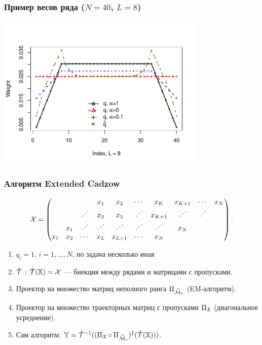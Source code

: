 \documentclass[unicode, notheorems]{beamer}
\begin{document}
\begin{frame}
	\frametitle{Пример весов ряда ($N = 40$, $L = 8$)}
	\begin{center}
		\includegraphics*[width = 10cm]{weights.pdf}
	\end{center}	
\end{frame}

\begin{frame}
	\frametitle{Алгоритм Extended Cadzow}
	\begin{equation*}
	\mathcal{X} = \begin{pmatrix}
	&  &  & x_1 & x_2 & \cdots & x_K & x_{K+1} & \cdots & x_N \\ 
	&  & \iddots & x_2 & x_3 & \iddots & x_{K+1} & \iddots & \iddots &  \\ 
	& x_1 & \iddots & \iddots & \iddots & \iddots & \iddots & x_N &  &  \\ 
	x_1 & x_2 & \cdots & x_L & x_{L+1} & \cdots & x_N &  &  & 
	\end{pmatrix}.
	\end{equation*}
	\begin{enumerate}
		\item $q_i = 1$, $i = 1, \ldots, N$, но задача несколько иная
		\item $\tilde {\mathcal{T}}$ : $\tilde {\mathcal{T}}(\mathbb{X}) = \mathcal{X}$ --- биекция между рядами и матрицами с пропусками.
		\item Проектор на множество матриц неполного ранга $\Pi_{\widetilde {\mathcal{M}}_r}$ (EM-алгоритм).
		\item Проектор на множество траекторных матриц с пропусками $\Pi_{\mathfrak{X}}$ (диагональное усреднение).
		\item Сам алгоритм: $\mathbb{Y} = \tilde {\mathcal{T}}^{-1}((\Pi_{\mathfrak{X}} \circ \Pi_{\widetilde {\mathcal{M}}_r})^I (\tilde {\mathcal{T}}(\mathbb{X})))$.
	\end{enumerate}
\end{frame}
\end{document}
